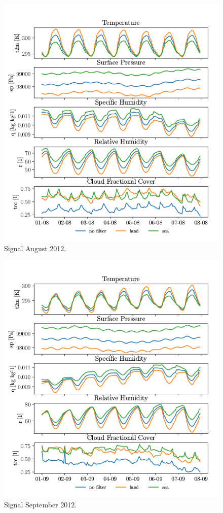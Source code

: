 \begin{figure}[ht]
    \centering
    \includegraphics{python_figs/spatially_averaged_one_week_from_2012-08-01.png}
    \caption{Signal August 2012.}
    \label{fig:jan12}
\end{figure}

\begin{figure}[ht]
    \centering
    \includegraphics{python_figs/spatially_averaged_one_week_from_2012-09-01.png}
    \caption{Signal September 2012.}
    \label{fig:sep12}
\end{figure}


